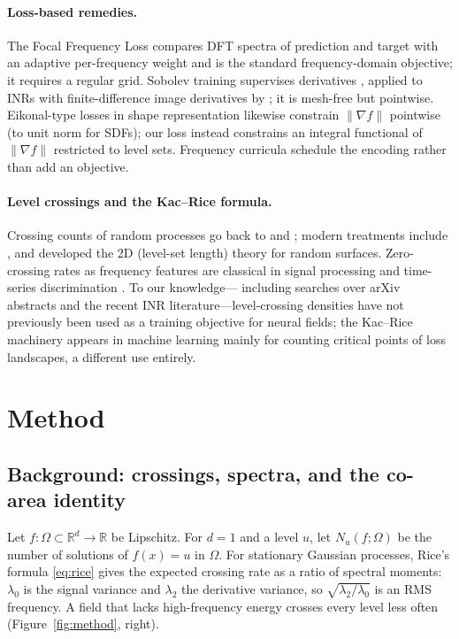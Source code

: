\documentclass[10pt]{article}
\newcommand{\R}{\mathbb{R}}
\begin{document}
\paragraph{Loss-based remedies.}
The Focal Frequency Loss \citep{jiang2021ffl} compares DFT spectra of prediction and
target with an adaptive per-frequency weight and is the standard frequency-domain
objective; it requires a regular grid. Sobolev training supervises derivatives
\citep{czarnecki2017sobolev}, applied to INRs with finite-difference image derivatives
by \citet{yuan2022sobolev}; it is mesh-free but pointwise. Eikonal-type losses in shape
representation \citep{gropp2020igr} likewise constrain $\lVert\nabla f\rVert$ pointwise
(to unit norm for SDFs); our loss instead constrains an integral functional of
$\lVert\nabla f\rVert$ restricted to level sets. Frequency curricula
\citep{hertz2021sape,yang2023freenerf} schedule the encoding rather than add an
objective.

\paragraph{Level crossings and the Kac--Rice formula.}
Crossing counts of random processes go back to \citet{kac1943} and \citet{rice1944};
modern treatments include \citet{adler2007random,azais2009level}, and
\citet{longuethiggins1957} developed the 2D (level-set length) theory for random
surfaces. Zero-crossing rates as frequency features are classical in signal processing
and time-series discrimination \citep{kedem1986zerocrossings}. To our knowledge---%
including searches over arXiv abstracts and the recent INR literature---level-crossing
densities have not previously been used as a training objective for neural fields; the
Kac--Rice machinery appears in machine learning mainly for counting critical points of
loss landscapes, a different use entirely.

\section{Method}
\label{sec:method}

\subsection{Background: crossings, spectra, and the co-area identity}
\label{sec:background}

Let $f:\Omega\subset\R^d\to\R$ be Lipschitz. For $d=1$ and a level $u$, let
$N_u(f;\Omega)$ be the number of solutions of $f(x)=u$ in $\Omega$. For stationary
Gaussian processes, Rice's formula \eqref{eq:rice} gives the expected crossing rate as a
ratio of spectral moments: $\lambda_0$ is the signal variance and $\lambda_2$ the
derivative variance, so $\sqrt{\lambda_2/\lambda_0}$ is an RMS frequency. A field that
lacks high-frequency energy crosses every level less often
(Figure~\ref{fig:method}, right).
\end{document}
